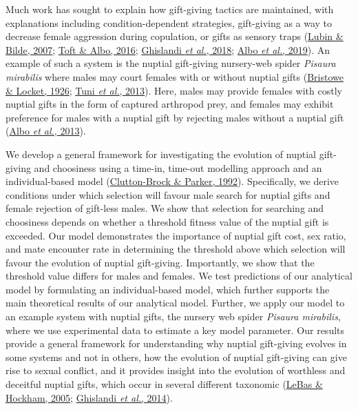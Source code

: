 \documentclass[
]{article}
\begin{document}
Much work has sought to explain how gift-giving tactics are maintained,
with explanations including condition-dependent strategies, gift-giving
as a way to decrease female aggression during copulation, or gifts as
sensory traps (\protect\hyperlink{ref-Lubin2007}{Lubin \& Bilde, 2007};
\protect\hyperlink{ref-Toft2016}{Toft \& Albo, 2016};
\protect\hyperlink{ref-Ghislandi2018}{Ghislandi \emph{et al.}, 2018};
\protect\hyperlink{ref-Albo2019}{Albo \emph{et al.}, 2019}). An example
of such a system is the nuptial gift-giving nursery-web spider
\emph{Pisaura mirabilis} where males may court females with or without
nuptial gifts (\protect\hyperlink{ref-Bristowe1926}{Bristowe \& Locket,
1926}; \protect\hyperlink{ref-Tuni2013a}{Tuni \emph{et al.}, 2013}).
Here, males may provide females with costly nuptial gifts in the form of
captured arthropod prey, and females may exhibit preference for males
with a nuptial gift by rejecting males without a nuptial gift
(\protect\hyperlink{ref-Albo2013}{Albo \emph{et al.}, 2013}).

We develop a general framework for investigating the evolution of
nuptial gift-giving and choosiness using a time-in, time-out modelling
approach and an individual-based model
(\protect\hyperlink{ref-Clutton-Brock1992}{Clutton-Brock \& Parker,
1992}). Specifically, we derive conditions under which selection will
favour male search for nuptial gifts and female rejection of gift-less
males. We show that selection for searching and choosiness depends on
whether a threshold fitness value of the nuptial gift is exceeded. Our
model demonstrates the importance of nuptial gift cost, sex ratio, and
mate encounter rate in determining the threshold above which selection
will favour the evolution of nuptial gift-giving. Importantly, we show
that the threshold value differs for males and females. We test
predictions of our analytical model by formulating an individual-based
model, which further supports the main theoretical results of our
analytical model. Further, we apply our model to an example system with
nuptial gifts, the nursery web spider \emph{Pisaura mirabilis}, where we
use experimental data to estimate a key model parameter. Our results
provide a general framework for understanding why nuptial gift-giving
evolves in some systems and not in others, how the evolution of nuptial
gift-giving can give rise to sexual conflict, and it provides insight
into the evolution of worthless and deceitful nuptial gifts, which occur
in several different taxonomic (\protect\hyperlink{ref-LeBas2005}{LeBas
\& Hockham, 2005}; \protect\hyperlink{ref-Ghislandi2014}{Ghislandi
\emph{et al.}, 2014}).
\end{document}

